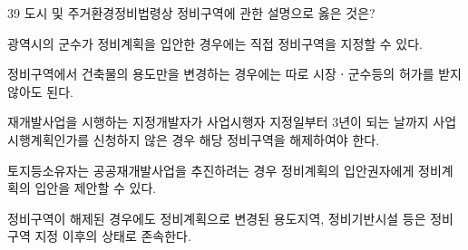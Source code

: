 \begin{question}{39}
도시 및 주거환경정비법령상 정비구역에 관한 설명으로 옳은 것은?
\begin{choices}
  \item 광역시의 군수가 정비계획을 입안한 경우에는 직접 정비구역을 지정할 수 있다.
  \item 정비구역에서 건축물의 용도만을 변경하는 경우에는 따로 시장ㆍ군수등의 허가를 받지 않아도 된다.
  \item 재개발사업을 시행하는 지정개발자가 사업시행자 지정일부터 3년이 되는 날까지 사업시행계획인가를 신청하지 않은 경우 해당 정비구역을 해제하여야 한다.
  \item 토지등소유자는 공공재개발사업을 추진하려는 경우 정비계획의 입안권자에게 정비계획의 입안을 제안할 수 있다.
  \item 정비구역이 해제된 경우에도 정비계획으로 변경된 용도지역, 정비기반시설 등은 정비구역 지정 이후의 상태로 존속한다.
\end{choices}
\end{question}
